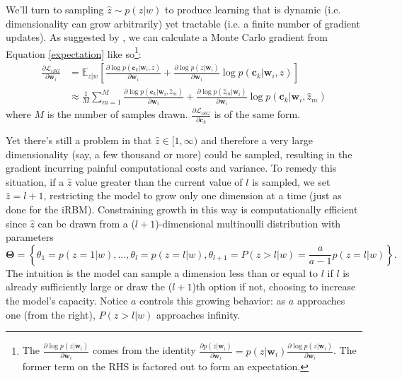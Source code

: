 \documentclass{article} %
\begin{document}
We'll turn to sampling $\hat z \sim p(z|w)$ to produce learning that is dynamic (i.e. dimensionality can grow arbitrarily) yet tractable (i.e. a finite number of gradient updates).  As suggested by \cite{xu2015show}, we can calculate a Monte Carlo gradient from Equation \ref{expectation} like so\footnote{The $\frac{\partial \log p( z  |  \mathbf{w}_i)}{\partial \mathbf{w}_{i}}$ comes from the identity $\frac{\partial p( z  |  \mathbf{w}_i)}{\partial \mathbf{w}_{i}}=p( z  |  \mathbf{w}_i)\frac{\partial \log p( z  |  \mathbf{w}_i)}{\partial \mathbf{w}_{i}}$.  The former term on the RHS is factored out to form an expectation.}: \begin{align}\frac{\partial \mathcal{L}_{iSG}}{\partial \mathbf{w}_{i}} &= \mathbb{E}_{z|w} [\frac{\partial \log p(\mathbf{c}_k  |  \mathbf{w}_i , z)}{\partial \mathbf{w}_{i}}+\frac{\partial \log p( z  |  \mathbf{w}_i)}{\partial \mathbf{w}_{i}} \log p(\mathbf{c}_k  |  \mathbf{w}_i , z) ] \\
&\approx \frac{1}{M}  \sum_{m=1}^{M} \frac{\partial \log p(\mathbf{c}_k  |  \mathbf{w}_i , \hat{z}_{m})}{\partial \mathbf{w}_{i}}+\frac{\partial \log p( \hat{z}_{m}  |  \mathbf{w}_i)}{\partial \mathbf{w}_{i}} \log p(\mathbf{c}_k  |  \mathbf{w}_i , \hat{z}_{m}) \end{align} where $M$ is the number of samples drawn.  $\frac{\partial \mathcal{L}_{iSG}}{\partial \mathbf{c}_{k}}$ is of the same form.  

Yet there's still a problem in that $\hat z \in [1, \infty)$ and therefore a very large dimensionality (say, a few thousand or more) could be sampled, resulting in the gradient incurring painful computational costs and variance.  To remedy this situation, if a $\hat z$ value greater than the current value of $l$ is sampled, we set $\hat z = l + 1$, restricting the model to grow only one dimension at a time (just as done for the iRBM).  Constraining growth in this way is computationally efficient since $\hat z$ can be drawn from a ($l+1$)-dimensional multinoulli distribution with parameters $$\mathbf{\Theta} = \left \{\theta_{1}=p(z=1|w),\ldots, \theta_{l}=p(z=l|w), \theta_{l+1}=P(z>l|w)=\frac{a}{a-1}p(z=l|w) \right \}.$$  The intuition is the model can sample a dimension less than or equal to $l$ if $l$ is already sufficiently large or draw the ($l+1$)th option if not, choosing to increase the model's capacity.  Notice $a$ controls this growing behavior: as $a$ approaches one (from the right), $P(z>l|w)$ approaches infinity.
\end{document}
